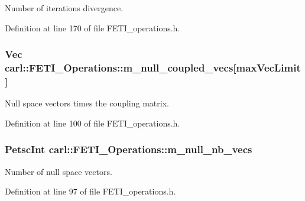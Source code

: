 Number of iterations divergence. 



Definition at line 170 of file F\+E\+T\+I\+\_\+operations.\+h.

\hypertarget{classcarl_1_1_f_e_t_i___operations_a162af22ae7e7410cf5ce6fe07f301e63}{}
\subsubsection[{m\+\_\+null\+\_\+coupled\+\_\+vecs}]{\setlength{\rightskip}{0pt plus 5cm}Vec carl\+::\+F\+E\+T\+I\+\_\+\+Operations\+::m\+\_\+null\+\_\+coupled\+\_\+vecs\mbox{[}{\bf max\+Vec\+Limit}\mbox{]}\hspace{0.3cm}{\ttfamily [protected]}}\label{classcarl_1_1_f_e_t_i___operations_a162af22ae7e7410cf5ce6fe07f301e63}


Null space vectors times the coupling matrix. 



Definition at line 100 of file F\+E\+T\+I\+\_\+operations.\+h.

\hypertarget{classcarl_1_1_f_e_t_i___operations_a6be71b08544858c4b4609bf2a2927a17}{}
\subsubsection[{m\+\_\+null\+\_\+nb\+\_\+vecs}]{\setlength{\rightskip}{0pt plus 5cm}Petsc\+Int carl\+::\+F\+E\+T\+I\+\_\+\+Operations\+::m\+\_\+null\+\_\+nb\+\_\+vecs\hspace{0.3cm}{\ttfamily [protected]}}\label{classcarl_1_1_f_e_t_i___operations_a6be71b08544858c4b4609bf2a2927a17}


Number of null space vectors. 



Definition at line 97 of file F\+E\+T\+I\+\_\+operations.\+h.

\hypertarget{classcarl_1_1_f_e_t_i___operations_a81ca84aa058155a0a0f586625c6f93b7}{}
